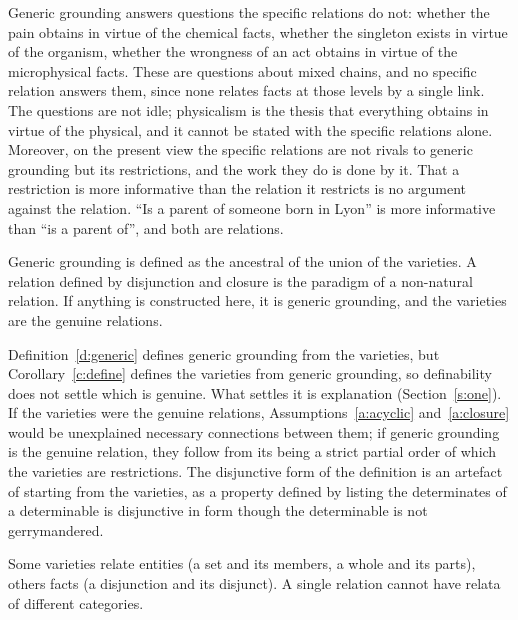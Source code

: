 \documentclass{situationist-preprint}
\begin{document}
\begin{reply}
Generic grounding answers questions the specific relations do not: whether the pain obtains in virtue of the chemical facts, whether the singleton exists in virtue of the organism, whether the wrongness of an act obtains in virtue of the microphysical facts. These are questions about mixed chains, and no specific relation answers them, since none relates facts at those levels by a single link. The questions are not idle; physicalism is the thesis that everything obtains in virtue of the physical, and it cannot be stated with the specific relations alone. Moreover, on the present view the specific relations are not rivals to generic grounding but its restrictions, and the work they do is done by it. That a restriction is more informative than the relation it restricts is no argument against the relation. \enquote{Is a parent of someone born in Lyon} is more informative than \enquote{is a parent of}, and both are relations.
\end{reply}

\begin{objection}\label{o:gerry}
Generic grounding is defined as the ancestral of the union of the varieties. A relation defined by disjunction and closure is the paradigm of a non-natural relation. If anything is constructed here, it is generic grounding, and the varieties are the genuine relations.
\end{objection}

\begin{reply}
Definition~\ref{d:generic} defines generic grounding from the varieties, but Corollary~\ref{c:define} defines the varieties from generic grounding, so definability does not settle which is genuine. What settles it is explanation (Section~\ref{s:one}). If the varieties were the genuine relations, Assumptions~\ref{a:acyclic} and~\ref{a:closure} would be unexplained necessary connections between them; if generic grounding is the genuine relation, they follow from its being a strict partial order of which the varieties are restrictions. The disjunctive form of the definition is an artefact of starting from the varieties, as a property defined by listing the determinates of a determinable is disjunctive in form though the determinable is not gerrymandered.
\end{reply}

\begin{objection}\label{o:relata}
Some varieties relate entities (a set and its members, a whole and its parts), others facts (a disjunction and its disjunct). A single relation cannot have relata of different categories.
\end{objection}
\end{document}

